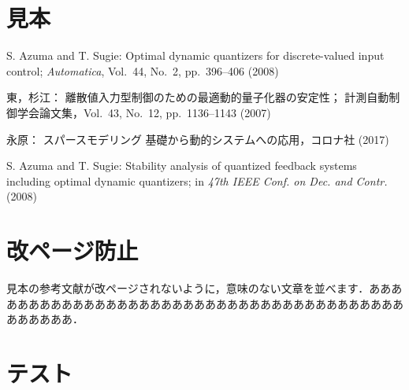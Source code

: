 \documentclass[J,amsmath]{scitrans}
\begin{document}
  \section*{見本}
    \begin{thebibliography}{9}
      S. Azuma and T. Sugie:
      Optimal dynamic quantizers for discrete-valued input control;
      {\it Automatica}, Vol.~44, No.~2, pp.~396--406 (2008)

      東，杉江：
      離散値入力型制御のための最適動的量子化器の安定性；
      計測自動制御学会論文集，Vol.~43, No.~12, pp.~1136--1143 (2007)

      永原：
      スパースモデリング 基礎から動的システムへの応用，コロナ社 (2017)



      S. Azuma and T. Sugie:
      Stability analysis of quantized feedback systems including optimal dynamic quantizers;
      in {\it 47th IEEE Conf. on Dec. and Contr.} (2008)
    \end{thebibliography}

  \section*{改ページ防止}
    見本の参考文献が改ページされないように，意味のない文章を並べます．あああああああああああああああああああああああああああああああああああああああああああああ．


  \section*{テスト}
    
    
\end{document}
